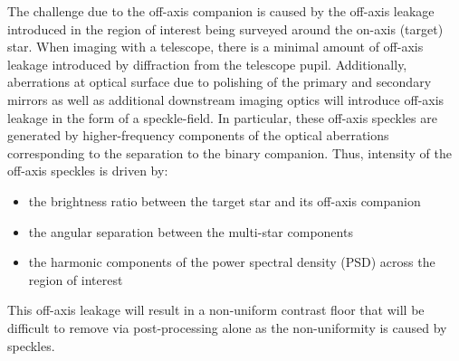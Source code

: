 \documentclass[]{spie}  %
\begin{document}
The challenge due to the off-axis companion is caused by the off-axis leakage introduced in the region of interest being surveyed around the on-axis (target) star. When imaging with a telescope, there is a minimal amount of off-axis leakage introduced by diffraction from the telescope pupil. Additionally, aberrations at optical surface due to polishing of the primary and secondary mirrors as well as additional downstream imaging optics will introduce  off-axis leakage in the form of a speckle-field. In particular, these off-axis speckles are generated by higher-frequency components of the optical aberrations corresponding to the separation to the binary companion. Thus, intensity of the off-axis speckles is driven by:
\begin{itemize}
\item the brightness ratio between the target star and its off-axis companion
\item the angular separation between the multi-star components
\item the harmonic components of the power spectral density (PSD) across the region of interest
\end{itemize}
This off-axis leakage will result in a non-uniform contrast floor that will be difficult to remove via post-processing alone as the non-uniformity is caused by speckles. 
\end{document}
